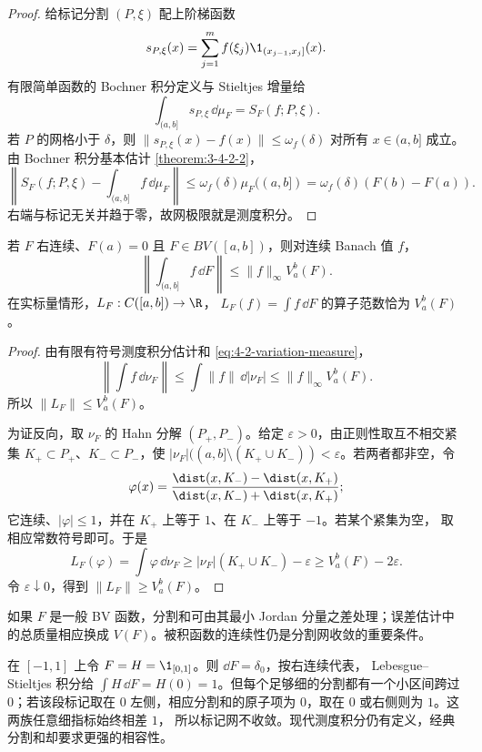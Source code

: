 \begin{proof}
给标记分割 $(P,\xi)$ 配上阶梯函数
\[
 s_{P,\xi}(x)=\sum_{j=1}^mf(\xi_j)\1_{(x_{j-1},x_j]}(x).
\]
有限简单函数的 Bochner 积分定义与 Stieltjes 增量给
\[
 \int_{(a,b]}s_{P,\xi}\,\dd\mu_F=S_F(f;P,\xi).
\]
若 $P$ 的网格小于 $\delta$，则
$\|s_{P,\xi}(x)-f(x)\|\le\omega_f(\delta)$ 对所有 $x\in(a,b]$ 成立。由 Bochner 积分基本估计
\cref{theorem:3-4-2-2}，
\[
 \left\|S_F(f;P,\xi)-\int_{(a,b]}f\,\dd\mu_F\right\|
 \le\omega_f(\delta)\mu_F((a,b])
 =\omega_f(\delta)(F(b)-F(a)).
\]
右端与标记无关并趋于零，故网极限就是测度积分。
\end{proof}

\begin{proposition}\label{proposition:4-2-2-3}
若 $F$ 右连续、$F(a)=0$ 且 $F\in BV([a,b])$，则对连续 Banach 值 $f$，
\[
 \left\|\int_{(a,b]}f\,\dd F\right\|
 \le\|f\|_\infty V_a^b(F).
\]
在实标量情形，$L_F:C([a,b])\to\R$，
$L_F(f)=\int f\,\dd F$ 的算子范数恰为 $V_a^b(F)$。
\end{proposition}

\begin{proof}
由有限有符号测度积分估计和 \eqref{eq:4-2-variation-measure}，
\[
 \left\|\int f\,\dd\nu_F\right\|
 \le\int\|f\|\,\dd|\nu_F|
 \le\|f\|_\infty V_a^b(F).
\]
所以 $\|L_F\|\le V_a^b(F)$。

为证反向，取 $\nu_F$ 的 Hahn 分解 $(P_+,P_-)$。给定 $\varepsilon>0$，由正则性取互不相交紧集
$K_+\subset P_+$、$K_-\subset P_-$，使
$|\nu_F|((a,b]\setminus(K_+\cup K_-))<\varepsilon$。若两者都非空，令
\[
 \varphi(x)=
 \frac{\dist(x,K_-)-\dist(x,K_+)}
      {\dist(x,K_-)+\dist(x,K_+)};
\]
它连续、$|\varphi|\le1$，并在 $K_+$ 上等于 $1$、在 $K_-$ 上等于 $-1$。若某个紧集为空，
取相应常数符号即可。于是
\[
 L_F(\varphi)=\int\varphi\,\dd\nu_F
 \ge |\nu_F|(K_+\cup K_-)-\varepsilon
 \ge V_a^b(F)-2\varepsilon.
\]
令 $\varepsilon\downarrow0$，得到 $\|L_F\|\ge V_a^b(F)$。
\end{proof}

如果 $F$ 是一般 BV 函数，分割和可由其最小 Jordan 分量之差处理；误差估计中的总质量相应换成
$V(F)$。被积函数的连续性仍是分割网收敛的重要条件。

\begin{remark}[共同跳跃使标记网失败]
在 $[-1,1]$ 上令 $F=H=\1_{[0,1]}$。则 $\dd F=\delta_0$，按右连续代表，
Lebesgue--Stieltjes 积分给
$\int H\,\dd F=H(0)=1$。但每个足够细的分割都有一个小区间跨过 $0$；若该段标记取在
$0$ 左侧，相应分割和的原子项为 $0$，取在 $0$ 或右侧则为 $1$。这两族任意细指标始终相差 $1$，
所以标记网不收敛。现代测度积分仍有定义，经典分割和却要求更强的相容性。
\end{remark}

